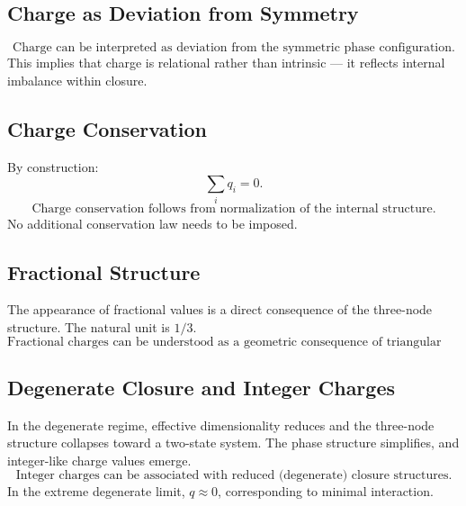 \subsection{Charge as Deviation from Symmetry}

\begin{equation}
  \boxed{
    \text{Charge can be interpreted as deviation from the symmetric
    phase configuration.}
  }
\end{equation}
This implies that charge is relational rather than intrinsic ---
it reflects internal imbalance within closure.

\subsection{Charge Conservation}

By construction:
\begin{equation}
  \sum_i q_i = 0.
\end{equation}
\begin{equation}
  \boxed{
    \text{Charge conservation follows from normalization of the
    internal structure.}
  }
\end{equation}
No additional conservation law needs to be imposed.

\subsection{Fractional Structure}

The appearance of fractional values is a direct consequence
of the three-node structure.
The natural unit is $1/3$.
\begin{equation}
  \boxed{
    \text{Fractional charges can be understood as a geometric consequence
    of triangular closure.}
  }
\end{equation}

\subsection{Degenerate Closure and Integer Charges}

In the degenerate regime, effective dimensionality reduces and
the three-node structure collapses toward a two-state system.
The phase structure simplifies, and integer-like charge values emerge.
\begin{equation}
  \boxed{
    \text{Integer charges can be associated with reduced (degenerate)
    closure structures.}
  }
\end{equation}
In the extreme degenerate limit, $q \approx 0$,
corresponding to minimal interaction.


